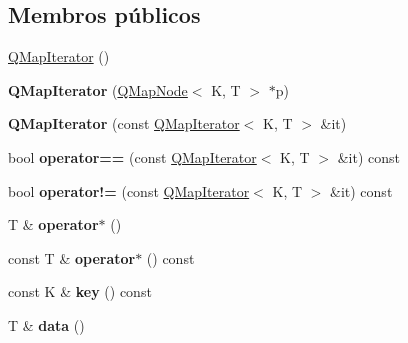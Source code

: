 \subsection*{Membros públicos}
\begin{DoxyCompactItemize}
\item 
\hyperlink{class_q_map_iterator_a1b5cb90b3b8a9e5aa95014d667798ede}{Q\-Map\-Iterator} ()
\item 
\hypertarget{class_q_map_iterator_a34cebf540de8143c410b7b975c791d2f}{{\bfseries Q\-Map\-Iterator} (\hyperlink{struct_q_map_node}{Q\-Map\-Node}$<$ K, T $>$ $\ast$p)}\label{class_q_map_iterator_a34cebf540de8143c410b7b975c791d2f}

\item 
\hypertarget{class_q_map_iterator_add1bb9c7d8caeac6d285552219acdaa0}{{\bfseries Q\-Map\-Iterator} (const \hyperlink{class_q_map_iterator}{Q\-Map\-Iterator}$<$ K, T $>$ \&it)}\label{class_q_map_iterator_add1bb9c7d8caeac6d285552219acdaa0}

\item 
\hypertarget{class_q_map_iterator_a85b2f13f53690cf19f3a3d2326d8d7e6}{bool {\bfseries operator==} (const \hyperlink{class_q_map_iterator}{Q\-Map\-Iterator}$<$ K, T $>$ \&it) const }\label{class_q_map_iterator_a85b2f13f53690cf19f3a3d2326d8d7e6}

\item 
\hypertarget{class_q_map_iterator_aeaf158c527e6386c23fd76c7b7b2c7fe}{bool {\bfseries operator!=} (const \hyperlink{class_q_map_iterator}{Q\-Map\-Iterator}$<$ K, T $>$ \&it) const }\label{class_q_map_iterator_aeaf158c527e6386c23fd76c7b7b2c7fe}

\item 
\hypertarget{class_q_map_iterator_af7f8c6b921dca2b94f6e7ee14e762770}{T \& {\bfseries operator$\ast$} ()}\label{class_q_map_iterator_af7f8c6b921dca2b94f6e7ee14e762770}

\item 
\hypertarget{class_q_map_iterator_a0ad02595c2fdf7a496eda1d646060eab}{const T \& {\bfseries operator$\ast$} () const }\label{class_q_map_iterator_a0ad02595c2fdf7a496eda1d646060eab}

\item 
\hypertarget{class_q_map_iterator_ad3258d2da7673cb912692ea56ce149d5}{const K \& {\bfseries key} () const }\label{class_q_map_iterator_ad3258d2da7673cb912692ea56ce149d5}

\item 
\hypertarget{class_q_map_iterator_a15fa34a0bc0f88cbd5431917049c804e}{T \& {\bfseries data} ()}\label{class_q_map_iterator_a15fa34a0bc0f88cbd5431917049c804e}


\end{DoxyCompactItemize}
